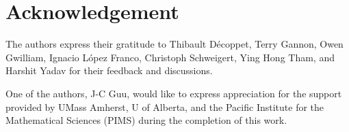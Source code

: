 \section*{Acknowledgement}

The authors express their gratitude to Thibault Décoppet, Terry Gannon, Owen
Gwilliam, Ignacio L\'{o}pez Franco, Christoph Schweigert, Ying Hong Tham, and Harshit Yadav for their
feedback and discussions.

One of the authors, J-C Guu, would like to express appreciation for the support
provided by UMass Amherst, U of Alberta, and the Pacific Institute for the
Mathematical Sciences (PIMS) during the completion of this work.
